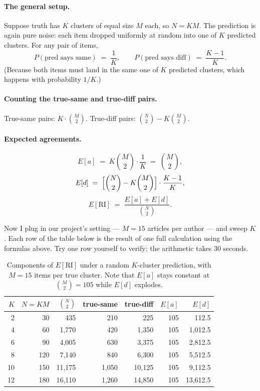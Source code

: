 \documentclass[11pt]{article}
\begin{document}
\paragraph{The general setup.}
Suppose truth has $K$ clusters of equal size $M$ each, so $N = K M$. The
prediction is again pure noise: each item dropped uniformly at random into
one of $K$ predicted clusters. For any pair of items,
\[
  P(\text{pred says same}) \;=\; \frac{1}{K},
  \qquad
  P(\text{pred says diff}) \;=\; \frac{K - 1}{K}.
\]
(Because both items must land in the same one of $K$ predicted clusters,
which happens with probability $1/K$.)

\paragraph{Counting the true-same and true-diff pairs.}
True-same pairs: $K \cdot \binom{M}{2}$.
True-diff pairs: $\binom{N}{2} - K \binom{M}{2}$.

\paragraph{Expected agreements.}
\[
  E[a] \;=\; K \binom{M}{2} \cdot \frac{1}{K} \;=\; \binom{M}{2},
\]
\[
  E[d] \;=\; \Bigl[\binom{N}{2} - K \binom{M}{2}\Bigr] \cdot \frac{K - 1}{K},
\]
\[
  E[\text{RI}] \;=\; \frac{E[a] + E[d]}{\binom{N}{2}}.
\]

Now I plug in our project's setting --- $M = 15$ articles per author ---
and sweep $K$. Each row of the table below is the result of one full
calculation using the formulas above. Try one row yourself to verify; the
arithmetic takes 30 seconds.

\begin{table}[H]
\centering
\small
\begin{tabular}{r r r r r r r}
\toprule
$K$ & $N = KM$ & $\binom{N}{2}$ & true-same & true-diff & $E[a]$ & $E[d]$ \\
\midrule
2  & 30  & 435    & 210  & 225    & 105 & 112.5 \\
4  & 60  & 1{,}770   & 420  & 1{,}350  & 105 & 1{,}012.5 \\
6  & 90  & 4{,}005   & 630  & 3{,}375  & 105 & 2{,}812.5 \\
8  & 120 & 7{,}140   & 840  & 6{,}300  & 105 & 5{,}512.5 \\
10 & 150 & 11{,}175  & 1{,}050 & 10{,}125 & 105 & 9{,}112.5 \\
12 & 180 & 16{,}110  & 1{,}260 & 14{,}850 & 105 & 13{,}612.5 \\
\bottomrule
\end{tabular}
\caption{Components of $E[\text{RI}]$ under a random $K$-cluster prediction,
with $M = 15$ items per true cluster. Note that $E[a]$ stays constant at
$\binom{M}{2} = 105$ while $E[d]$ explodes.}
\end{table}
\end{document}
